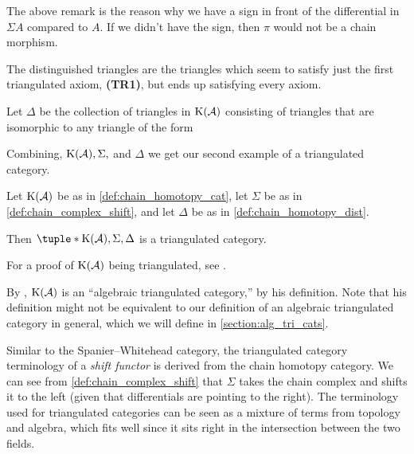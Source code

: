 The above remark is the reason why we have a sign in front of the differential in \( \Sigma A \) compared to \( A \). If we didn't have the sign, then \( \pi \) would not be a chain morphism.

The distinguished triangles are the triangles which seem to satisfy just the first triangulated axiom, {\bf (TR1)}, but ends up satisfying every axiom.

\begin{definition}
    \label{def:chain_homotopy_dist}
    Let \( \Delta \) be the collection of triangles in \( \operatorname{K}({\mathcal{A}}) \) consisting of triangles that are isomorphic to any triangle of the form

    \begin{center}
    \end{center}
\end{definition}

Combining, \( \operatorname{K}({\mathcal{A}}), \Sigma, \) and \( \Delta \) we get our second example of a triangulated category.

\begin{example}
    Let \( \operatorname{K}({\mathcal{A}}) \) be as in \autoref{def:chain_homotopy_cat}, let \( \Sigma \) be as in \autoref{def:chain_complex_shift}, and let \( \Delta \) be as in \autoref{def:chain_homotopy_dist}.

    Then \( \tuple*{\K(\Ac), \Sigma, \Delta} \) is a triangulated category.
\end{example}
For a proof of \( \operatorname{K}({\mathcal{A}}) \) being triangulated, see \cite[Proposition 3.5.25]{Zimmermann_2014}.

By \cite[Section 7.5]{Krause_2007}, \( \operatorname{K}({\mathcal{A}}) \) is an ``algebraic triangulated category,'' by his definition. Note that his definition might not be equivalent to our definition of an algebraic triangulated category in general, which we will define in \autoref{section:alg_tri_cats}.

Similar to the Spanier--Whitehead category, the triangulated category terminology of a \emph{shift functor} is derived from the chain homotopy category. We can see from \autoref{def:chain_complex_shift} that \( \Sigma \) takes the chain complex and shifts it to the left (given that differentials are pointing to the right). The terminology used for triangulated categories can be seen as a mixture of terms from topology and algebra, which fits well since it sits right in the intersection between the two fields.

